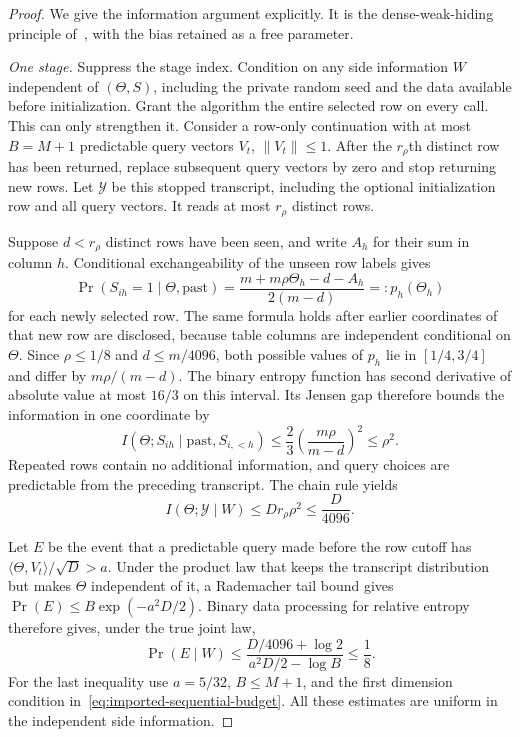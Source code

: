 \documentclass[11pt,a4paper]{article}
\theoremstyle{remark}
\begin{document}
\begin{proof}
We give the information argument explicitly.  It is the dense-weak-hiding
principle of~\cite{dense2026}, with the bias retained as a free parameter.

\emph{One stage.}
Suppress the stage index.  Condition on any side information $W$ independent
of $(\Theta,S)$, including the private random seed and the data available
before initialization.  Grant the algorithm the entire selected row on
every call.  This can only strengthen it.  Consider a row-only continuation
with at most $B=M+1$ predictable query vectors $V_t$, $\|V_t\|\le1$.
After the $r_\rho$th distinct row has been returned, replace subsequent
query vectors by zero and stop returning new rows.  Let $\mathcal Y$ be
this stopped transcript, including the optional initialization row and all
query vectors.  It reads at most $r_\rho$ distinct rows.

Suppose $d<r_\rho$ distinct rows have been seen, and write
$A_h$ for their sum in column $h$.  Conditional exchangeability of the
unseen row labels gives
\[
 \Pr(S_{ih}=1\mid\Theta,\text{past})
 =\frac{m+m\rho\Theta_h-d-A_h}{2(m-d)}=:p_h(\Theta_h)
\]
for each newly selected row.  The same formula holds after earlier
coordinates of that new row are disclosed, because table columns are
independent conditional on $\Theta$.  Since $\rho\le1/8$ and
$d\le m/4096$, both possible values of $p_h$ lie in $[1/4,3/4]$ and differ
by $m\rho/(m-d)$.  The binary entropy function has second derivative of
absolute value at most $16/3$ on this interval.  Its Jensen gap therefore
bounds the information in one coordinate by
\[
 I(\Theta;S_{ih}\mid\text{past},S_{i,<h})
 \le \frac23\left(\frac{m\rho}{m-d}\right)^2
 \le\rho^2.
\]
Repeated rows contain no additional information, and query choices are
predictable from the preceding transcript.  The chain rule yields
\[
 I(\Theta;\mathcal Y\mid W)
 \le D r_\rho\rho^2\le\frac{D}{4096}.
\]

Let $E$ be the event that a predictable query made before the row cutoff
has $\langle\Theta,V_t\rangle/\sqrt D>a$.
Under the product law that keeps the transcript distribution but makes
$\Theta$ independent of it, a Rademacher tail bound gives
$\Pr(E)\le B\exp(-a^2D/2)$.  Binary data processing for relative entropy
therefore gives, under the true joint law,
\[
 \Pr(E\mid W)
 \le\frac{D/4096+\log2}{a^2D/2-\log B}
 \le\frac18.
\]
For the last inequality use $a=5/32$,
$B\le M+1$, and the first dimension condition
in~\eqref{eq:imported-sequential-budget}.
All these estimates are uniform in the independent side information.


\end{proof}
\end{document}
